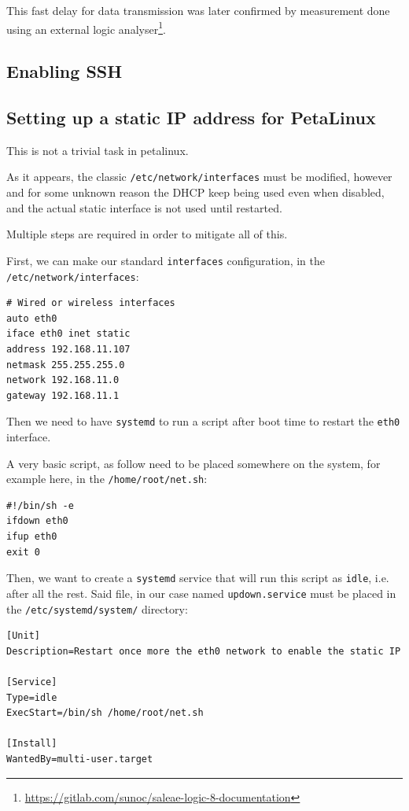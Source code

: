\documentclass[10pt]{article}
\begin{document}
This fast delay for data transmission was later confirmed by measurement done using an external logic analyser\footnote{\url{https://gitlab.com/sunoc/saleae-logic-8-documentation}}.

\subsection{Enabling SSH}
\label{sec:org530e702}
\subsection{Setting up a static IP address for PetaLinux}
\label{sec:orgf703fb6}
This is not a trivial task in petalinux.

As it appears, the classic \texttt{/etc/network/interfaces} must be modified, however and
for some unknown reason the DHCP keep being used even when disabled, and the
actual static interface is not used until restarted.

Multiple steps are required in order to mitigate all of this.

First, we can make our standard \texttt{interfaces} configuration, in the  \texttt{/etc/network/interfaces}:
\begin{verbatim}
# Wired or wireless interfaces
auto eth0
iface eth0 inet static
address 192.168.11.107
netmask 255.255.255.0
network 192.168.11.0
gateway 192.168.11.1
\end{verbatim}

Then we need to have \texttt{systemd} to run a script after boot time to restart the \texttt{eth0} interface.

A very basic script, as follow need to be placed somewhere on the system, for example here, in the \texttt{/home/root/net.sh}:
\begin{verbatim}
#!/bin/sh -e
ifdown eth0
ifup eth0
exit 0
\end{verbatim}

Then, we want to create a \texttt{systemd} service that will run this script as \texttt{idle},
i.e. after all the rest. Said file, in our case named \texttt{updown.service} must be
placed in the \texttt{/etc/systemd/system/} directory:
\begin{verbatim}
[Unit]
Description=Restart once more the eth0 network to enable the static IP

[Service]
Type=idle
ExecStart=/bin/sh /home/root/net.sh

[Install]
WantedBy=multi-user.target
\end{verbatim}
\end{document}
